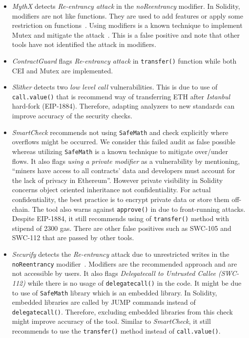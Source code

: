 \begin{itemize}[noitemsep,topsep=0pt]
	\item \textit{MythX} detects \textit{Re-entrancy attack} in the \textit{noReentrancy} modifier. In Solidity, modifiers are not like functions. They are used to add features or apply some restriction on functions~\cite{SolidityModifer}. Using modifiers is a known technique to implement Mutex and mitigate the attack~\cite{ReentrancyGuard}. This is a false positive and note that other tools have not identified the attack in modifiers.

	\item \textit{ContractGuard} flags \textit{Re-entrancy attack} in \texttt{transfer()} function while both CEI and Mutex are implemented.

	\item \textit{Slither} detects two \textit{low level call} vulnerabilities\cite{SlitherSetup}. This is due to use of \texttt{call.value()} that is recommend way of transferring ETH after \textit{Istanbul} hard-fork (EIP-1884).	Therefore, adapting analyzers to new standards can improve accuracy of the security checks.

	\item \textit{SmartCheck} recommends not using \texttt{SafeMath} and check explicitly where overflows might be occurred. We consider this failed audit as false possible whereas utilizing \texttt{SafeMath} is a known technique to mitigate over/under flows. It also flags \textit{using a private modifier} as a vulnerability by mentioning, ``miners have access to all contracts' data and developers must account for the lack of privacy in Ethereum''. However private visibility in Solidity concerns object oriented inheritance not confidentiality. For actual confidentiality, the best practice is to encrypt private data or store them off-chain. The tool also warns against \texttt{approve()} in \erc due to front-running attacks. Despite EIP-1884, it still recommends using of \texttt{transfer()} method with stipend of 2300 gas. There are other false positives such as SWC-105 and SWC-112 that are passed by other tools.
	\item \textit{Securify} detects the \textit{Re-entrancy} attack due to unrestricted writes in the \texttt{noReentrancy} modifier~\cite{SECURIFY}. Modifiers are the recommended approach and are not accessible by users. It also flags \textit{Delegatecall to Untrusted Callee (SWC-112)} while there is no usage of \texttt{delegatecall()} in the code. It might be due to use of \texttt{SafeMath} library which is an embedded library. In Solidity, embedded libraries are called by JUMP commands instead of \texttt{delegatecall()}. Therefore, excluding embedded libraries from this check might improve accuracy of the tool. Similar to \textit{SmartCheck}, it still recommends to use the \texttt{transfer()} method instead of \texttt{call.value()}.


\end{itemize}
